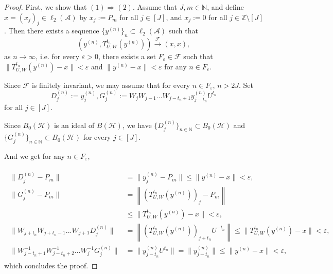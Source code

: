 \documentclass{article}
\begin{document}
\begin{proof}
First, we show that $(1)\Rightarrow(2)$. Assume that $J,m\in \mathbb{N}$, and define $x=(x_{j})_{j}\in \ell_{2}(\mathcal{A})$ by $x_{j}:=P_{m}$ for all $j\in [J]$, and $x_{j}:=0$ for all $j\in \mathbb{Z}\setminus[J]$. Then there exists a sequence $\{y^{(n)}\}_{n}\subset \ell_{2}(\mathcal{A})$ such that
\[\left(y^{(n)},T^{t_{n}}_{U,W}(y^{(n)})\right)\stackrel{\mathcal F}{\longrightarrow}(x,x),\]
as $n\rightarrow\infty$, i.e. for every $\varepsilon>0$, there exists a set $F_{\varepsilon}\in\mathcal{F}$ such that $\|T^{t_{n}}_{U,W}(y^{(n)})-x\|<\varepsilon$ and $\|y^{(n)}-x\|<\varepsilon$ for any $n\in F_{\varepsilon}$.

Since $\mathcal{F}$ is finitely invariant, we may assume that for every $n\in F_{\varepsilon}$, $n>2J$.
Set
\[D^{(n)}_{j}:=y^{(n)}_{j}, G^{(n)}_{j}:=W_{j}W_{j-1}...W_{j-t_{n}+1}y^{(n)}_{j-t_{n}}U^{t_{n}}\]
for all $j\in[J]$.

Since $B_{0}(\mathcal{H})$ is an ideal of $B(\mathcal{H})$, we have  $\{D^{(n)}_{j}\}_{n\in\mathbb{N}}\subset B_{0}(\mathcal{H})$ and $\{G^{(n)}_{j}\}_{n\in\mathbb{N}}\subset B_{0}(\mathcal{H})$ for every $j\in[J]$.

And we get for any $n\in F_{\varepsilon}$,

\begin{eqnarray}\begin{split}\nonumber
\|D^{(n)}_{j}-P_{m}\|&=\|y^{(n)}_{j}-P_{m}\|\leq\|y^{(n)}-x\|<\varepsilon,\\
\|G^{(n)}_{j}-P_{m}\|&=\left\|\left(T^{t_{n}}_{U,W}(y^{(n)})\right)_{j}-P_{m}\right\|\\
&\leq\|T^{t_{n}}_{U,W}(y^{(n)})-x\|<\varepsilon,\\
\|W_{j+t_{n}}W_{j+t_{n}-1}...W_{j+1}D^{(n)}_{j}\|&=\left\|\left(T^{t_{n}}_{U,W}(y^{(n)})\right)_{j+t_{n}}U^{-t_{n}}\right\|\leq \|T^{t_{n}}_{U,W}(y^{(n)})-x\|<\varepsilon,\\
\|W^{-1}_{j-t_{n}+1}W^{-1}_{j-t_{n}+2}...W^{-1}_{j}G^{(n)}_{j}\|&=\|y^{(n)}_{j-t_{n}}U^{t_{n}}\|=\|y^{(n)}_{j-t_{n}}\|
\leq\|y^{(n)}-x\|<\varepsilon,
\end{split}\end{eqnarray}
which concludes the proof.


\end{proof}
\end{document}
